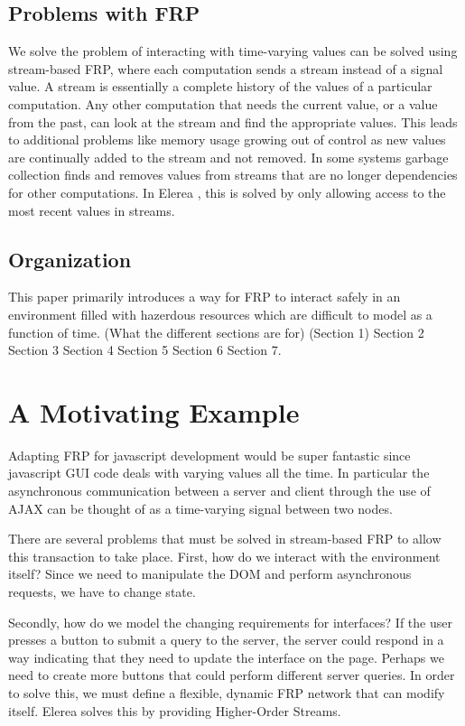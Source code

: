 \documentclass[twocolumn,11pt,english]{article}
\begin{document}
\subsection{Problems with FRP}
We solve the problem of interacting with time-varying values can be solved using stream-based FRP, where each computation sends a stream instead of a signal value. A stream is essentially a complete history of the values of a particular computation. Any other computation that needs the current value, or a value from the past, can look at the stream and find the appropriate values. This leads to additional problems like memory usage growing out of control as new values are continually added to the stream and not removed. In some systems garbage collection finds and removes values from streams that are no longer dependencies for other computations. In Elerea \cite{HighOrderStreams}, this is solved by only allowing access to the most recent values in streams. 


\subsection{Organization}
This paper primarily introduces a way for FRP to interact safely in an environment filled with hazerdous resources which are difficult to model as a function of time. (What the different sections are for) (Section 1) Section 2 Section 3 Section 4 Section 5 Section 6 Section 7.

\section{A Motivating Example}
Adapting FRP for javascript development would be super fantastic since javascript GUI code deals with varying values all the time. In particular the asynchronous communication between a server and client through the use of AJAX can be thought of as a time-varying signal between two nodes. 

There are several problems that must be solved in stream-based FRP to allow this transaction to take place. First, how do we interact with the environment itself? Since we need to manipulate the DOM and perform asynchronous requests, we have to change state. 

Secondly, how do we model the changing requirements for interfaces? If the user presses a button to submit a query to the server, the server could respond in a way indicating that they need to update the interface on the page. Perhaps we need to create more buttons that could perform different server queries. In order to solve this, we must define a flexible, dynamic FRP network that can modify itself. Elerea solves this by providing Higher-Order Streams. 
\end{document}
